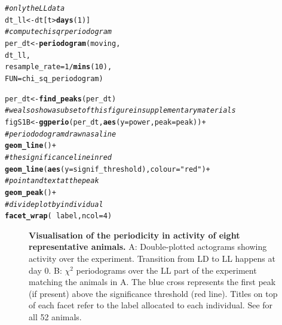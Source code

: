 \documentclass[10pt,letterpaper]{article}\usepackage[]{graphicx}\usepackage[]{color}
\makeatletter
\newcommand{\hlnum}[1]{\textcolor[rgb]{0.686,0.059,0.569}{#1}}%
\newcommand{\hlstr}[1]{\textcolor[rgb]{0.192,0.494,0.8}{#1}}%
\newcommand{\hlcom}[1]{\textcolor[rgb]{0.678,0.584,0.686}{\textit{#1}}}%
\newcommand{\hlopt}[1]{\textcolor[rgb]{0,0,0}{#1}}%
\newcommand{\hlstd}[1]{\textcolor[rgb]{0.345,0.345,0.345}{#1}}%
\newcommand{\hlkwb}[1]{\textcolor[rgb]{0.69,0.353,0.396}{#1}}%
\newcommand{\hlkwc}[1]{\textcolor[rgb]{0.333,0.667,0.333}{#1}}%
\newcommand{\hlkwd}[1]{\textcolor[rgb]{0.737,0.353,0.396}{\textbf{#1}}}%
\newenvironment{kframe}{%
 \def\at@end@of@kframe{}%
 \ifinner\ifhmode%
  \def\at@end@of@kframe{\end{minipage}}%
  \begin{minipage}{\columnwidth}%
 \fi\fi%
 \def\FrameCommand##1{\hskip\@totalleftmargin \hskip-\fboxsep
 \colorbox{shadecolor}{##1}\hskip-\fboxsep
     \hskip-\linewidth \hskip-\@totalleftmargin \hskip\columnwidth}%
 \MakeFramed {\advance\hsize-\width
   \@totalleftmargin\z@ \linewidth\hsize
   \@setminipage}}%
 {\par\unskip\endMakeFramed%
 \at@end@of@kframe}
\newenvironment{knitrout}{}{} %
\makeatother
\begin{document}
\begin{knitrout}
\color{fgcolor}\begin{kframe}
\begin{alltt}
\hlcom{# only the LL data}
\hlstd{dt_ll} \hlkwb{<-} \hlstd{dt[t} \hlopt{>} \hlkwd{days}\hlstd{(}\hlnum{1}\hlstd{)]}
\hlcom{# compute chi sqr periodogram }
\hlstd{per_dt} \hlkwb{<-} \hlkwd{periodogram}\hlstd{(moving,}
                        \hlstd{dt_ll,}
                        \hlkwc{resample_rate} \hlstd{=} \hlnum{1} \hlopt{/} \hlkwd{mins}\hlstd{(}\hlnum{10}\hlstd{),}
                        \hlkwc{FUN}\hlstd{=chi_sq_periodogram)}

\hlstd{per_dt} \hlkwb{<-} \hlkwd{find_peaks}\hlstd{(per_dt)}
\hlcom{# we also show a subset of this figure in supplementary materials}
\hlstd{figS1B} \hlkwb{<-} \hlkwd{ggperio}\hlstd{(per_dt,} \hlkwd{aes}\hlstd{(}\hlkwc{y} \hlstd{= power,} \hlkwc{peak} \hlstd{= peak))} \hlopt{+}
                  \hlcom{# periododogram drawn as a line}
                  \hlkwd{geom_line}\hlstd{()} \hlopt{+}
                  \hlcom{# the significance line in red}
                  \hlkwd{geom_line}\hlstd{(}\hlkwd{aes}\hlstd{(}\hlkwc{y} \hlstd{= signif_threshold),} \hlkwc{colour} \hlstd{=} \hlstr{"red"}\hlstd{)} \hlopt{+}
                  \hlcom{# point and text at the peak}
                  \hlkwd{geom_peak}\hlstd{()} \hlopt{+}
                  \hlcom{# divide plot by individual}
                  \hlkwd{facet_wrap}\hlstd{(} \hlopt{~} \hlstd{label,} \hlkwc{ncol} \hlstd{=} \hlnum{4}\hlstd{)}
\end{alltt}
\end{kframe}
\end{knitrout}







\begin{figure}[!h]
	\caption{{\bf Visualisation of the periodicity in activity of eight representative animals.}
		A: Double-plotted actograms showing activity over the experiment. Transition from LD to LL happens at day 0.
		B: $\chi{}^2$ periodograms over the LL part of the experiment matching the animals in A.
		The blue cross represents the first peak (if present) above the significance threshold (red line).
		Titles on top of each facet refer to the label allocated to each individual.
		See  for all 52 animals.
	}
	\label{fig:fig-4}
\end{figure}
\end{document}
